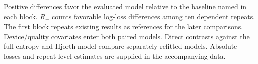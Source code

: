 \begin{minipage}{\textwidth}\footnotesize Positive differences favor the evaluated model relative to the baseline named in each block. $R_+$ counts favorable log-loss differences among ten dependent repeats. The first block repeats existing results as references for the later comparisons. Device/quality covariates enter both paired models. Direct contrasts against the full entropy and Hjorth model compare separately refitted models. Absolute losses and repeat-level estimates are supplied in the accompanying data.\end{minipage}
\endgroup
